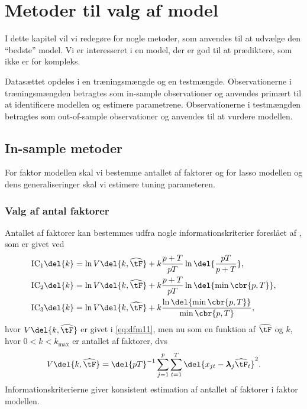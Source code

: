\chapter{Metoder til valg af model} \label{ch:metoder}
I dette kapitel vil vi redegøre for nogle metoder, som anvendes til at udvælge den ``bedste'' model. 
Vi er interesseret i en model, der er god til at prædiktere, som ikke er for kompleks.

Datasættet opdeles i en træningsmængde og en testmængde. 
Observationerne i træningsmængden betragtes som in-sample observationer og anvendes primært til at identificere modellen og estimere parametrene. 
Observationerne i testmængden betragtes som out-of-sample observationer og anvendes til at vurdere modellen. 
 
\section{In-sample metoder}
For faktor modellen skal vi bestemme antallet af faktorer og for lasso modellen og dens generaliseringer skal vi estimere tuning parameteren.

\subsection{Valg af antal faktorer} \label{sec:faktorer}
Antallet af faktorer kan bestemmes udfra nogle informationskriterier foreslået af \citep{Bai_Ng}, som er givet ved
\begin{align}
\text{IC}_1 \del{k} &= \ln V \del{k, \widehat{\tF}} + k \frac{p + T}{p T} \ln \del{\frac{p T}{p + T}}, \label{eq:ic1} \\
\text{IC}_2 \del{k} &= \ln V \del{k, \widehat{\tF}} + k \frac{p + T}{p T} \ln \del{ \min \cbr{p, T}}, \label{eq:ic2} \\
\text{IC}_3 \del{k} &= \ln V \del{k, \widehat{\tF}} + k \frac{\ln \del{\min \cbr{p, T}}}{\min \cbr{p, T}}, \label{eq:ic3}
\end{align}
hvor \(V \del{k, \widehat{\tF}}\) er givet i \eqref{eq:dfm11}, men nu som en funktion af \(\widehat{\tF}\) og \(k\), hvor \(0<k<k_\text{max}\) er antallet af faktorer, dvs
\begin{align*}
V \del{k, \widehat{\tF}} = \del{p T}^{-1} \sum_{j=1}^p \sum_{t=1}^{T} \del{x_{jt} -\boldsymbol{\lambda}_j \widehat{\tF}_t}^2.
\end{align*}
Informationskriterierne giver konsistent estimation af antallet af faktorer i faktor modellen.

